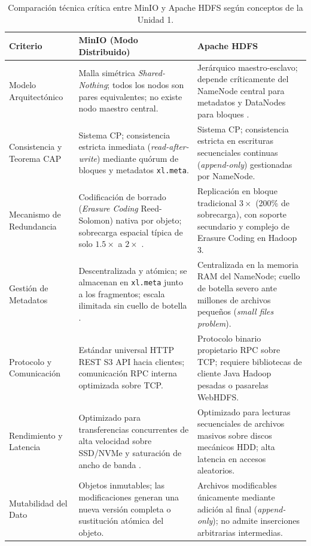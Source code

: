 \documentclass[12pt,a4paper]{article}
\begin{document}
\begin{table}[H]
\centering\footnotesize
\caption{Comparación técnica crítica entre MinIO y Apache HDFS según conceptos de la Unidad 1.}
\begin{tabularx}{\linewidth}{@{}p{2.6cm}X X@{}}
\toprule
\textbf{Criterio} & \textbf{MinIO (Modo Distribuido)} & \textbf{Apache HDFS} \\
\midrule
Modelo Arquitectónico & Malla simétrica \emph{Shared-Nothing}; todos los nodos son pares equivalentes; no existe nodo maestro central. & Jerárquico maestro-esclavo; depende críticamente del NameNode central para metadatos y DataNodes para bloques \cite{malhotra2025evaluating}. \\
Consistencia y Teorema CAP & Sistema CP; consistencia estricta inmediata (\emph{read-after-write}) mediante quórum de bloques y metadatos \texttt{xl.meta}. & Sistema CP; consistencia estricta en escrituras secuenciales continuas (\emph{append-only}) gestionadas por NameNode. \\
Mecanismo de Redundancia & Codificación de borrado (\emph{Erasure Coding} Reed-Solomon) nativa por objeto; sobrecarga espacial típica de solo $1.5\times$ a $2\times$ \cite{shin2023cache}. & Replicación en bloque tradicional $3\times$ (200\% de sobrecarga), con soporte secundario y complejo de Erasure Coding en Hadoop 3. \\
Gestión de Metadatos & Descentralizada y atómica; se almacenan en \texttt{xl.meta} junto a los fragmentos; escala ilimitada sin cuello de botella \cite{han2025rdio}. & Centralizada en la memoria RAM del NameNode; cuello de botella severo ante millones de archivos pequeños (\emph{small files problem}). \\
Protocolo y Comunicación & Estándar universal HTTP REST S3 API hacia clientes; comunicación RPC interna optimizada sobre TCP. & Protocolo binario propietario RPC sobre TCP; requiere bibliotecas de cliente Java Hadoop pesadas o pasarelas WebHDFS. \\
Rendimiento y Latencia & Optimizado para transferencias concurrentes de alta velocidad sobre SSD/NVMe y saturación de ancho de banda \cite{han2025rdio}. & Optimizado para lecturas secuenciales de archivos masivos sobre discos mecánicos HDD; alta latencia en accesos aleatorios. \\
Mutabilidad del Dato & Objetos inmutables; las modificaciones generan una nueva versión completa o sustitución atómica del objeto. & Archivos modificables únicamente mediante adición al final (\emph{append-only}); no admite inserciones arbitrarias intermedias. \\
\bottomrule
\end{tabularx}
\label{tab:comparacion_hdfs}
\end{table}
\end{document}
